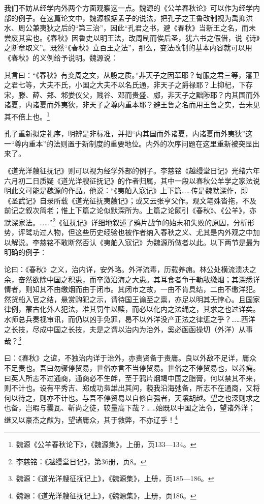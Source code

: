 \documentclass[a4paper, 12pt, openright]{ctexbook}
\renewenvironment{quote}
  {\list{}{\rightmargin2\ccwd \leftmargin2\ccwd \itemindent=2\ccwd \listparindent=2\ccwd}%
   \item\relax\small\kaishu\color{black}}
  {\endlist}
\begin{document}
我们不妨从经学内外两个方面观察这一点。魏源的《公羊春秋论》可以作为经学内部的例子。在这篇论文中，魏源根据孟子的说法，把孔子之王鲁改制视为禹抑洪水、周公兼夷狄之后的“第三治”，因此“孔君之书，避《春秋》当新王之名，而未尝废其实也。《春秋》因鲁史以明王法，改周制而俟后圣，犹六书之假借，说《诗》之断章取义”。既然“《春秋》立百王之法”，那么，变法改制的基本内容就可以用《春秋》的义例给予说明。魏源说：

\begin{quote}
其言曰：“《春秋》有变周之文，从殷之质。”非天子之因革耶？甸服之君三等，藩卫之君七等，大夫不氏，小国之大夫不以名氏通，非天子之爵禄耶？上抑杞，下存宋，滕、薛、郑、邾娄仪父，贱谷、邓而贵盛、郕，非天子之黜陟耶？内其国而外诸夏，内诸夏而外夷狄，非天子之尊内重本耶？避王鲁之名而用王鲁之实，吾未见其不倍上也。\footnote{魏源《公羊春秋论下》，《魏源集》，上册，页133—134。}
\end{quote}

孔子重新拟定礼序，明辨是非标准，并把“内其国而外诸夏，内诸夏而外夷狄”这一“尊内重本”的法则置于新制度的重要地位。内外的次序问题在这里重新被突显出来了。

《道光洋艘征抚记》则可以视为经学外部的例子。李慈铭《越缦堂日记》光绪六年六月初二日质疑《道光洋艘征抚记》的作者归属，其中一段以春秋公羊学之家法说明此文可能是魏源的作品。他说：“《夷舶入寇记》上下篇……传是魏默深作，即《圣武记》自录所载《道光征抚夷艘记》；或又云张亨父作。观文笔殊沓拖，不及前记之叙次简老；惟上下篇之论似默深所为。上篇之论颇引《春秋》、《公羊》，亦默深家法。……”\footnote{李慈铭：《越缦堂日记》，第36册，页8。}《征抚记》详细地叙述了鸦片战争的始末和失败的原因，分析形势，评骘功过人物，但这些历史经验也被作者纳入春秋之义、尤其是内外观之中加以解说。李慈铭不敢断然否认《夷舶入寇记》为魏源所做者以此。以下两节是最为明确的例子：

\begin{quote}
论曰：《春秋》之义，治内详，安外略。外洋流毒，历载养痈。林公处横流溃决之余，奋然欲除中国之积患，而卒激沿海之大患。其耳食者争于勒敌缴烟；其深悉详情者，则知其不由缴烟而由于闭市。其闭市之故，一由不肯具结，二由不缴洋犯。然货船入官之结，悬赏购犯之示，请待国王谕至之禀，亦足以明其无悖心。且国家律例，蒙古化外人犯法，准其罚牛以赎，而必以化内之法绳之，其求之也过详矣。水师总兵奏视审讯，而仍以凶手免罪，曷不以外洋没产正法之律惩之乎？……西洋之长技，尽成中国之长技，夫是之谓以治内为治外，奚必函函操切（外洋）从事哉？\footnote{魏源：《道光洋艘征抚记上》，《魏源集》，上册，页185—186。}
\end{quote}

\begin{quote}
曰：《春秋》之谊，不独治内详于治外，亦责贤备于责庸。良以外敌不足详，庸众不足责也。吾曰勿骤停贸易，世俗亦言不当停贸易。世俗之不停贸易也，以养痈。曰英人所志不过通商，通商必不生衅，至于鸦片烟竭中国之脂膏，何以禁其不来，则不计也。设有平秀吉、郑成功枭雄出其间，藐我沿海弛备，所志不在通商，又将何以待之，则亦不计也。与吾不停贸易以自修自强者，天壤胡越。望之也深则求之也备，岂暇与囊瓦、靳尚之徒，较量高下哉？……始既以中国之法令，望诸外洋；继又以豪杰之猷为，望诸庸众，其于救弊，不亦辽乎！\footnote{魏源：《道光洋艘征抚记上》，《魏源集》，上册，页186。}
\end{quote}
\end{document}
